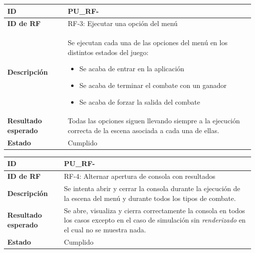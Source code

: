 \begin{center}
	\begin{tabular}{ | p{3cm} | p{10cm} | } 
		\hline
		
		\textbf{ID} & PU\_RF-\arabic{contador_pruebas_funcionales}
		{contador_pruebas_funcionales} \\
		
		\hline 
		\textbf{ID de RF} &
		RF-3: Ejecutar una opción del menú\\ 
		
		\hline
		\textbf{Descripción} & 
		Se ejecutan cada una de las opciones del menú en los distintos estados del juego:
		\begin{itemize}
			\item Se acaba de entrar en la aplicación
			\item Se acaba de terminar el combate con un ganador
			\item Se acaba de forzar la salida del combate 
		\end{itemize}\\
		
		\hline 
		\textbf{Resultado esperado} &
		Todas las opciones siguen llevando siempre a la ejecución correcta de la escena asociada a cada una de ellas.\\ 
		
		\hline 
		\textbf{Estado} &
		Cumplido\\ 
		
		\hline
	\end{tabular}
\end{center}

\begin{center}
	\begin{tabular}{ | p{3cm} | p{10cm} | } 
		\hline
		
		\textbf{ID} & PU\_RF-\arabic{contador_pruebas_funcionales}
		{contador_pruebas_funcionales} \\
		
		\hline 
		\textbf{ID de RF} &
		RF-4: Alternar apertura de consola con resultados\\ 
		
		\hline
		\textbf{Descripción} & 
		Se intenta abrir y cerrar la consola durante la ejecución de la escena del menú y durante todos los tipos de combate.\\
		
		\hline 
		\textbf{Resultado esperado} &
		Se abre, visualiza y cierra correctamente la consola en todos los casos excepto en el caso de simulación sin \textit{renderizado} en el cual no se muestra nada.\\ 
		
		\hline 
		\textbf{Estado} &
		Cumplido\\ 
		
		\hline
	\end{tabular}
\end{center}

